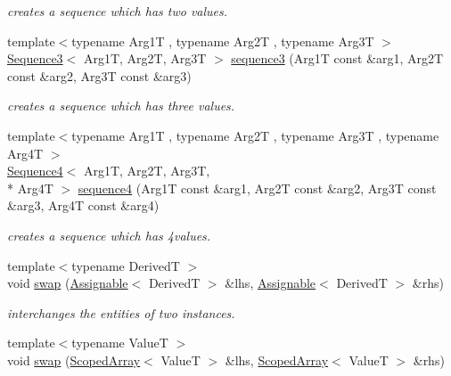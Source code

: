 \begin{DoxyCompactItemize}
\begin{DoxyCompactList}\small\item\em creates a sequence which has two values. \end{DoxyCompactList}\item 
\hypertarget{namespacehryky_a1e9f18a60e3a0425ac6d6496219b35c8}{{\footnotesize template$<$typename Arg1\-T , typename Arg2\-T , typename Arg3\-T $>$ }\\\hyperlink{classhryky_1_1_sequence3}{Sequence3}$<$ Arg1\-T, Arg2\-T, Arg3\-T $>$ \hyperlink{namespacehryky_a1e9f18a60e3a0425ac6d6496219b35c8}{sequence3} (Arg1\-T const \&arg1, Arg2\-T const \&arg2, Arg3\-T const \&arg3)}\label{namespacehryky_a1e9f18a60e3a0425ac6d6496219b35c8}

\begin{DoxyCompactList}\small\item\em creates a sequence which has three values. \end{DoxyCompactList}\item 
{\footnotesize template$<$typename Arg1\-T , typename Arg2\-T , typename Arg3\-T , typename Arg4\-T $>$ }\\\hyperlink{classhryky_1_1_sequence4}{Sequence4}$<$ Arg1\-T, Arg2\-T, Arg3\-T, \\*
Arg4\-T $>$ \hyperlink{namespacehryky_a2107ad509c2a26ac350cb1d10ad6c453}{sequence4} (Arg1\-T const \&arg1, Arg2\-T const \&arg2, Arg3\-T const \&arg3, Arg4\-T const \&arg4)
\begin{DoxyCompactList}\small\item\em creates a sequence which has 4values. \end{DoxyCompactList}\item 
\hypertarget{namespacehryky_ac0680d4816412ad35d571975809cccb2}{{\footnotesize template$<$typename Derived\-T $>$ }\\void \hyperlink{namespacehryky_ac0680d4816412ad35d571975809cccb2}{swap} (\hyperlink{classhryky_1_1_assignable}{Assignable}$<$ Derived\-T $>$ \&lhs, \hyperlink{classhryky_1_1_assignable}{Assignable}$<$ Derived\-T $>$ \&rhs)}\label{namespacehryky_ac0680d4816412ad35d571975809cccb2}

\begin{DoxyCompactList}\small\item\em interchanges the entities of two instances. \end{DoxyCompactList}\item 
\hypertarget{namespacehryky_ab921feae350c8120f8c39673c98017a1}{{\footnotesize template$<$typename Value\-T $>$ }\\void \hyperlink{namespacehryky_ab921feae350c8120f8c39673c98017a1}{swap} (\hyperlink{classhryky_1_1_scoped_array}{Scoped\-Array}$<$ Value\-T $>$ \&lhs, \hyperlink{classhryky_1_1_scoped_array}{Scoped\-Array}$<$ Value\-T $>$ \&rhs)}\label{namespacehryky_ab921feae350c8120f8c39673c98017a1}


\end{DoxyCompactItemize}
